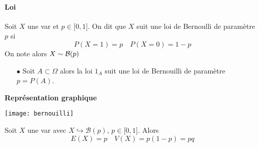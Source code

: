 \documentclass[a4paper, 11pt]{article}
\begin{document}
\paragraph{Loi}


\hspace{-0.7cm}  {  

\begin{defi} Soit $X$ une var et $p\in\lbrack 0,1\rbrack$. On dit que $X$ suit une loi de Bernoulli de param\`{e}tre $p$ si
$$P(X=1) = p \quad P(X=0) =1-p$$
 On note alors $X \sim  \mathcal{B}(p)$
\end{defi}
 
}


\begin{exemples}
\begin{itemize}
\item[$\bullet$] Soit $A\subset \Omega$ alors la loi $1_A$ suit une loi de Bernouilli de paramètre $p=P(A)$. 
\end{itemize}
\end{exemples}
 

\textbf{Repr\'esentation graphique}

 \begin{center}
 \texttt{[image: bernouilli]}
 \end{center}


%





%
%




\begin{prop} Soit $X$ une var avec $X\hookrightarrow \mathcal{B}(p)$, $p\in\lbrack 0,1\rbrack$. Alors
$$E(X) = p\quad V(X) = p(1-p)= pq$$

\end{prop}
 
\end{document}
